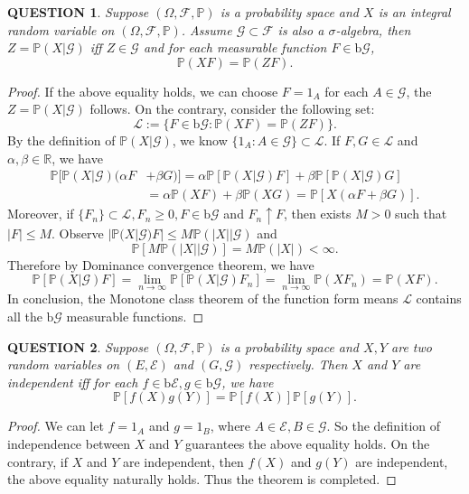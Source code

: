 \documentclass[12pt]{article}
\renewcommand{\(}{\left(}%
\renewcommand{\)}{\right)}%
\renewcommand{\[}{\left[}%
\renewcommand{\]}{\right]}%
\renewcommand{\r}{\mathbb{R}}
\renewcommand{\l}{\mathscr{L}}
\newcommand{\p}{\mathbb{P}}
\newcommand{\f}{\mathscr{F}}
\newcommand{\e}{\mathscr{E}}
\newcommand{\g}{\mathscr{G}}
\newtheorem{question}{QUESTION}[section]}
\newtheorem{proof}{Proof.}}
\begin{document}
  \begin{question}
   Suppose $(\Omega,\f,\p )$ is a probability space and $X$ is an integral random variable on $(\Omega,\f,\p )$. Assume $\g\subset\f$ is also a $\sigma$-algebra, then $Z=\p(X|\g)$ iff $Z\in\g$ and for each measurable function $F\in\mathrm{b} \g$,
   \begin{equation*}
    \p(XF)=\p(ZF).
   \end{equation*}
  \end{question}
  \begin{proof}
   If the above equality holds, we can choose $F=1_A$ for each $A\in\g$, the $Z=\p(X|\g)$ follows. On the contrary, consider the following set:
   \begin{equation*}
    \l :=\{F\in\mathrm{b} \g:\p(XF)=\p(ZF) \}.
   \end{equation*}
   By the definition of $\p(X|\g)$, we know $\{1_A:A\in\g\}\subset\l$. If $F,G\in\l$ and $\alpha,\beta\in\r$, we have
   \begin{equation*}
    \begin{split}
     \p[\p(X|\g)(\alpha F&+\beta G) ]=\alpha \p[\p(X|\g)F]+\beta\p[\p(X|\g)G]\\
     &=\alpha \p(XF)+\beta\p(XG)=\p[X(\alpha F+\beta G)].
    \end{split}
   \end{equation*}
   Moreover, if $\{F_n\}\subset\l, F_n\geq 0,F\in\mathrm{b}\g$ and $F_n\uparrow F$, then exists $M>0$ such that $|F|\leq M$. Observe
   $|\p(X|\g)F|\leq M\p(|X||\g)$ and
   \begin{equation*}
    \p[M\p(|X||\g)]=M\p(|X|)<\infty.
   \end{equation*}
   Therefore by {\sffamily Dominance convergence theorem}, we have
   \begin{equation*}
    \p\[\p(X|\g)F\]=\lim_{n\to\infty} \p[\p(X|\g)F_n]=\lim_{n\to\infty}\p(XF_n)=\p(XF).
   \end{equation*}
   In conclusion, the {\sffamily Monotone class theorem of the function form} means $\l$ contains all the $\mathrm{b}\g$ measurable functions.
  \end{proof}

  \begin{question}
   Suppose $(\Omega,\f,\p )$ is a probability space and $X,Y$ are two  random variables on $(E,\e)$ and $(G,\g)$ respectively. Then $X$ and $Y$ are independent iff for each $f\in\mathrm{b} \e,g\in\mathrm{b} \g$, we have
   \begin{equation*}
    \p[f(X)g(Y)]=\p[f(X)]\p[g(Y)].
   \end{equation*}
  \end{question}
  \begin{proof}
   We can let $f=1_A$ and $g=1_B$, where $A\in\e,B\in\g$. So the definition of independence between $X$ and $Y$ guarantees the above equality holds. On the contrary, if $X$ and $Y$ are independent, then $f(X)$ and $g(Y)$ are independent, the above equality naturally holds. Thus the theorem is completed.
  \end{proof}
\end{document}
